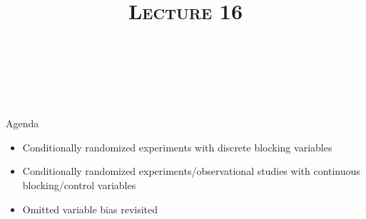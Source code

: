 \documentclass[xcolor={pst,x11names},compress]{beamer}
\renewcommand{\(}{\begin{columns}}
\renewcommand{\)}{\end{columns}}
\newcommand{\<}[1]{\begin{column}{#1}}
\renewcommand{\>}{\end{column}}
\begin{document}
\addtocounter{framenumber}{-1}




\date{}
\title{\large %
\textsc{Lecture 16}
}

  {\begin{center}
      {\inserttitle}\\\vspace{2.5cm}
      {\insertauthor}\\
      \insertdate\\
      \inserttitlegraphic
    \end{center}
    }
%
\begin{frame}[plain]
\maketitle
\end{frame}
%



\begin{frame}{Agenda}

\begin{itemize}
\item Conditionally randomized experiments with discrete blocking variables 
\item Conditionally randomized experiments/observational studies with continuous blocking/control variables
\item Omitted variable bias revisited
\end{itemize}

\end{frame}

%
%
\end{document}
